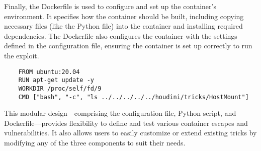 Finally, the Dockerfile is used to configure and set up the container's environment. It specifies how the container should be built, including copying necessary files (like the Python file) into the container and installing required dependencies. The Dockerfile also configures the container with the settings defined in the configuration file, ensuring the container is set up correctly to run the exploit.

\begin{listing}[H]
  \caption{}
\label{lst:dockerfile}
  \begin{verbatim}
    FROM ubuntu:20.04
    RUN apt-get update -y
    WORKDIR /proc/self/fd/9
    CMD ["bash", "-c", "ls ../../../../../houdini/tricks/HostMount"]
  \end{verbatim}
\end{listing}

This modular design—comprising the configuration file, Python script, and Dockerfile—provides flexibility to define and test various container escapes and vulnerabilities. It also allows users to easily customize or extend existing tricks by modifying any of the three components to suit their needs.